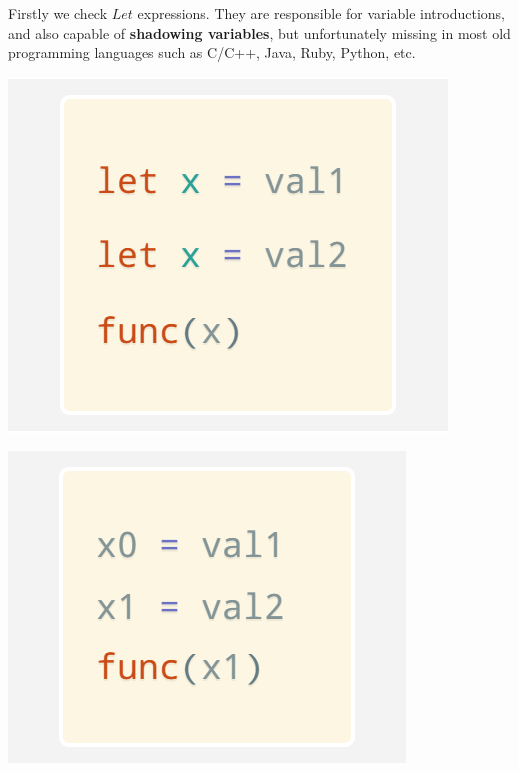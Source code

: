\documentclass[a1,portrait]{a1poster}
\begin{document}
\begin{multicols}{2}
Firstly we check $Let$ expressions. They are responsible for variable introductions,
and also capable of \textbf{shadowing variables}, but unfortunately missing in most old programming languages
such as C/C++, Java, Ruby, Python, etc.

\begin{multicols}{3}

\begin{minipage}[b]{1\linewidth}
\begin{center}\vspace{0.1cm}
\includegraphics[width=0.9\linewidth]{figs/let.png}
\end{center}\vspace{0.1cm}
\end{minipage}

\begin{minipage}[b]{1\linewidth}
\begin{center}\vspace{0.1cm}
\includegraphics[width=0.9\linewidth]{figs/let-by-mangling.png}
\end{center}\vspace{0.1cm}
\end{minipage}



\end{multicols}
\end{multicols}
\end{document}

